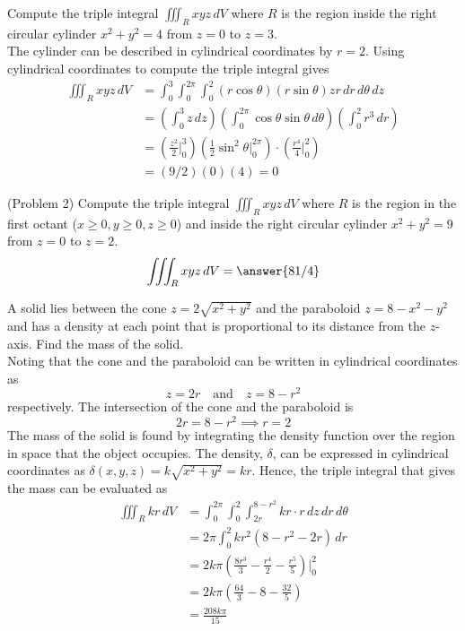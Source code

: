 \documentclass[handout]{ximera}
\begin{document}
\begin{example}[Example 2]
Compute the triple integral $\iiint_R xyz \, dV$ where $R$ is the region inside the right circular cylinder $ x^2 + y^2 = 4$ from $z = 0 $ to $z = 3$.\\
The cylinder can be described in cylindrical coordinates by $r = 2$. Using cylindrical coordinates to compute the triple integral gives
\begin{align*}
\iiint_R xyz \, dV &= \int_0^3 \int_0^{2\pi} \int_0^2 (r\cos \theta)(r\sin\theta)z r \, dr\, d\theta\, dz \\
                   &= \left(\int_0^3 z\, dz\right) \left( \int_0^{2\pi} \cos \theta \sin \theta \, d\theta\right) \left( \int_0^2 r^3 \, dr\right)\\
                   &= \left(\frac{z^2}{2} \bigg|_0^3\right) \left(\frac12 \sin^2 \theta \bigg|_0^{2\pi} \right) \cdot \left( \frac{r^4}{4} \bigg|_0^2 \right)\\
                   &= (9/2) (0) (4) = 0
\end{align*}
\end{example}


\begin{problem}(Problem 2)
Compute the triple integral $\iiint_R xyz \, dV$ where $R$ is the region in the first octant ($x\geq 0, y \geq 0, z \geq 0$) and 
inside the right circular cylinder $ x^2 + y^2 = 9$ from $z = 0 $ to $z = 2$.\\
\[ 
\iiint_R xyz \, dV = \answer{81/4}
\]
\end{problem}

\begin{example}[Example 3]
A solid lies between the cone $z = 2\sqrt{x^2 + y^2}$ and the paraboloid $z = 8 - x^2 - y^2$ and has a 
density at each point that is proportional to its distance from the $z$-axis. Find the mass of the solid.\\

Noting that the cone and the paraboloid can be written in cylindrical coordinates as
\[
 z = 2r \quad \text{and} \quad  z = 8 - r^2
\]
respectively. The intersection of the cone and the paraboloid is
\[
2r = 8 - r^2 \implies r = 2
\]
The mass of the solid is found by integrating the density function over the region in space that the object occupies.
The density, $\delta$, can be expressed in cylindrical coordinates as $\delta(x, y, z) = k \sqrt{x^2+y^2} = kr$.
Hence, the triple integral that gives the mass can be evaluated as
\begin{align*}
\iiint_R kr \, dV &=  \int_0^{2\pi} \int_0^2 \int_{2r}^{8-r^2} kr \cdot r \, dz \, dr \, d\theta \\
                  &= 2\pi \int_0^2 kr^2 (8 - r^2 - 2r) \,dr\\
                  &= 2k\pi \left(\frac{8r^3}{3} - \frac{r^4}{2} - \frac{r^5}{5} \right)\bigg|_0^2 \\
                  &= 2k\pi \left(\frac{64}{3} - 8 - \frac{32}{5}\right)\\
                  &= \frac{208k\pi}{15}
\end{align*}
\end{example}
\end{document}
